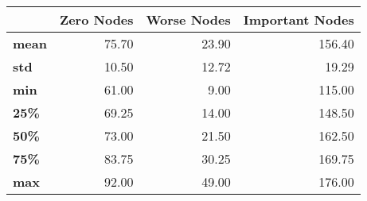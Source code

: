 \begin{tabular}{lrrr}
\toprule
{} &  Zero Nodes &  Worse Nodes &  Important Nodes \\
\midrule
\textbf{mean} &       75.70 &        23.90 &           156.40 \\
\textbf{std } &       10.50 &        12.72 &            19.29 \\
\textbf{min } &       61.00 &         9.00 &           115.00 \\
\textbf{25\% } &       69.25 &        14.00 &           148.50 \\
\textbf{50\% } &       73.00 &        21.50 &           162.50 \\
\textbf{75\% } &       83.75 &        30.25 &           169.75 \\
\textbf{max } &       92.00 &        49.00 &           176.00 \\
\bottomrule
\end{tabular}
